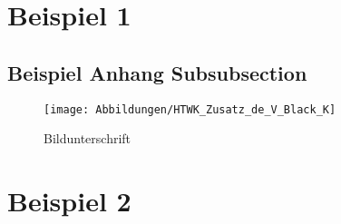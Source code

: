 \section{Beispiel 1}
\subsection{Beispiel Anhang Subsubsection}

\vspace{2 cm}
\begin{figure}[hb]
 \centering
 \texttt{[image: Abbildungen/HTWK\_Zusatz\_de\_V\_Black\_K]}
 \caption{Bildunterschrift}
 \label{fig_Bsp_Anhang}
\end{figure}





\newpage
\section{Beispiel 2}
